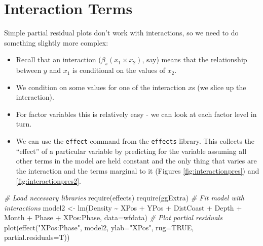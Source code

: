 \documentclass[
  oneside]{krantz}
\newenvironment{Shaded}{\begin{snugshade}}{\end{snugshade}}
\newcommand{\AttributeTok}[1]{\textcolor[rgb]{0.77,0.63,0.00}{#1}}
\newcommand{\CommentTok}[1]{\textcolor[rgb]{0.56,0.35,0.01}{\textit{#1}}}
\newcommand{\ConstantTok}[1]{\textcolor[rgb]{0.00,0.00,0.00}{#1}}
\newcommand{\FunctionTok}[1]{\textcolor[rgb]{0.00,0.00,0.00}{#1}}
\newcommand{\NormalTok}[1]{#1}
\newcommand{\OtherTok}[1]{\textcolor[rgb]{0.56,0.35,0.01}{#1}}
\newcommand{\SpecialCharTok}[1]{\textcolor[rgb]{0.00,0.00,0.00}{#1}}
\newcommand{\StringTok}[1]{\textcolor[rgb]{0.31,0.60,0.02}{#1}}
\providecommand{\tightlist}{%
  \setlength{\itemsep}{0pt}\setlength{\parskip}{0pt}}
\begin{document}
\hypertarget{interaction-terms}{%
\section{Interaction Terms}\label{interaction-terms}}

Simple partial residual plots don't work with interactions, so we need to do something slightly more complex:

\begin{itemize}
\tightlist
\item
  Recall that an interaction (\(\beta_s(x_1 \times x_2)\), say) means that the relationship between \(y\) and \(x_1\) is conditional on the values of \(x_2\).
\item
  We condition on some values for one of the interaction \(x\)s (we slice up the interaction).
\item
  For factor variables this is relatively easy - we can look at each factor level in turn.
\item
  We can use the \texttt{effect} command from the \texttt{effects} library. This collects the ``effect'' of a particular variable by predicting for the variable assuming all other terms in the model are held constant and the only thing that varies are the interaction and the terms marginal to it (Figures \ref{fig:interactionpres}) and \ref{fig:interactionpres2}.
\end{itemize}

\begin{Shaded}
\begin{Highlighting}[]
\CommentTok{\# Load necessary libraries}
\FunctionTok{require}\NormalTok{(effects)}
\FunctionTok{require}\NormalTok{(ggExtra)}
\CommentTok{\# Fit model with interactions}
\NormalTok{model2 }\OtherTok{\textless{}{-}} \FunctionTok{lm}\NormalTok{(Density }\SpecialCharTok{\textasciitilde{}}\NormalTok{ XPos }\SpecialCharTok{+}\NormalTok{ YPos }\SpecialCharTok{+}\NormalTok{ DistCoast }\SpecialCharTok{+}\NormalTok{ Depth }\SpecialCharTok{+} 
\NormalTok{                Month }\SpecialCharTok{+}\NormalTok{ Phase }\SpecialCharTok{+}\NormalTok{ XPos}\SpecialCharTok{:}\NormalTok{Phase, }\AttributeTok{data=}\NormalTok{wfdata)}
\CommentTok{\# Plot partial residuals}
\FunctionTok{plot}\NormalTok{(}\FunctionTok{effect}\NormalTok{(}\StringTok{"XPos:Phase"}\NormalTok{, model2, }\AttributeTok{ylab=}\StringTok{"XPos"}\NormalTok{, }\AttributeTok{rug=}\ConstantTok{TRUE}\NormalTok{, }\AttributeTok{partial.residuals=}\NormalTok{T))}
\end{Highlighting}
\end{Shaded}
\end{document}
